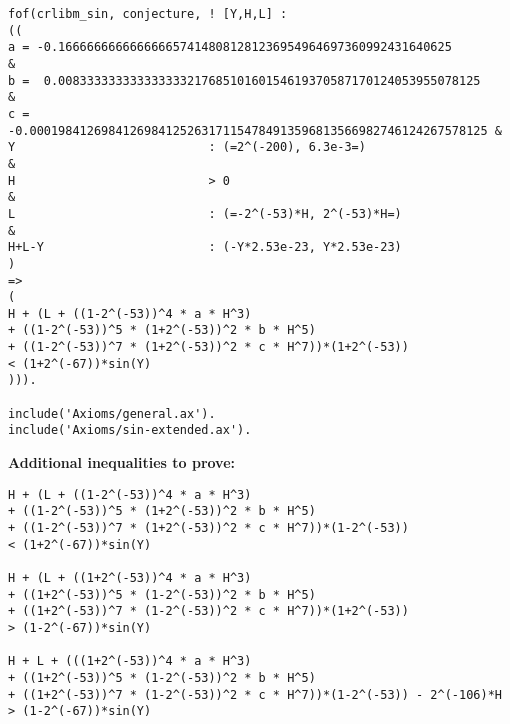 \documentclass{fac}
\begin{document}
\begin{lstlisting}
fof(crlibm_sin, conjecture, ! [Y,H,L] : 
((
a = -0.1666666666666666574148081281236954964697360992431640625          &
b =  0.00833333333333333321768510160154619370587170124053955078125      &
c = -0.0001984126984126984125263171154784913596813566982746124267578125 &
Y                           : (=2^(-200), 6.3e-3=)                      &  
H                           > 0                                         &
L                           : (=-2^(-53)*H, 2^(-53)*H=)                 &
H+L-Y                       : (-Y*2.53e-23, Y*2.53e-23)                 
) 
=>
( 
H + (L + ((1-2^(-53))^4 * a * H^3) 
+ ((1-2^(-53))^5 * (1+2^(-53))^2 * b * H^5) 
+ ((1-2^(-53))^7 * (1+2^(-53))^2 * c * H^7))*(1+2^(-53)) 
< (1+2^(-67))*sin(Y)    
))).

include('Axioms/general.ax').
include('Axioms/sin-extended.ax').
\end{lstlisting}


\noindent\textbf{Additional inequalities to prove:}
\begin{lstlisting}
H + (L + ((1-2^(-53))^4 * a * H^3) 
+ ((1-2^(-53))^5 * (1+2^(-53))^2 * b * H^5) 
+ ((1-2^(-53))^7 * (1+2^(-53))^2 * c * H^7))*(1-2^(-53)) 
< (1+2^(-67))*sin(Y)    

H + (L + ((1+2^(-53))^4 * a * H^3) 
+ ((1+2^(-53))^5 * (1-2^(-53))^2 * b * H^5) 
+ ((1+2^(-53))^7 * (1-2^(-53))^2 * c * H^7))*(1+2^(-53)) 
> (1-2^(-67))*sin(Y) 

H + L + (((1+2^(-53))^4 * a * H^3) 
+ ((1+2^(-53))^5 * (1-2^(-53))^2 * b * H^5) 
+ ((1+2^(-53))^7 * (1-2^(-53))^2 * c * H^7))*(1-2^(-53)) - 2^(-106)*H 
> (1-2^(-67))*sin(Y) 
\end{lstlisting}
\end{document}
